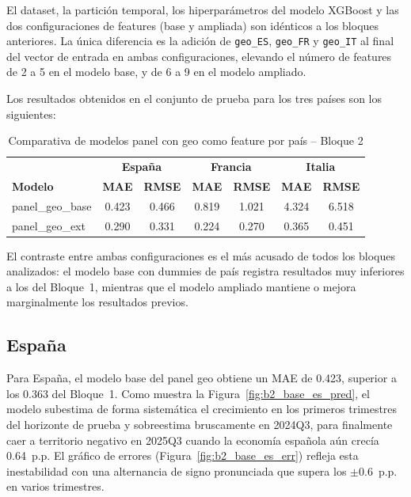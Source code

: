 El dataset, la partición temporal, los hiperparámetros del modelo XGBoost y las dos
configuraciones de features (base y ampliada) son idénticos a los bloques anteriores.
La única diferencia es la adición de \texttt{geo\_ES}, \texttt{geo\_FR} y \texttt{geo\_IT}
al final del vector de entrada en ambas configuraciones, elevando el número de features
de 2 a 5 en el modelo base, y de 6 a 9 en el modelo ampliado.

Los resultados obtenidos en el conjunto de prueba para los tres países son los siguientes:

\begin{table}[H]
\centering
\caption{Comparativa de modelos panel con geo como feature por país -- Bloque 2}
\label{tab:bloque2}
\small
\begin{tabular}{lcccccc}
\hline
 & \multicolumn{2}{c}{\textbf{España}} & \multicolumn{2}{c}{\textbf{Francia}} & \multicolumn{2}{c}{\textbf{Italia}} \\
\textbf{Modelo} & \textbf{MAE} & \textbf{RMSE} & \textbf{MAE} & \textbf{RMSE} & \textbf{MAE} & \textbf{RMSE} \\
\hline
panel\_geo\_base & 0.423 & 0.466 & 0.819 & 1.021 & 4.324 & 6.518 \\
panel\_geo\_ext  & 0.290 & 0.331 & 0.224 & 0.270 & 0.365 & 0.451 \\
\hline
\end{tabular}
\end{table}

El contraste entre ambas configuraciones es el más acusado de todos los bloques analizados:
el modelo base con dummies de país registra resultados muy inferiores a los del Bloque~1,
mientras que el modelo ampliado mantiene o mejora marginalmente los resultados previos.

\FloatBarrier
\subsection{España}

Para España, el modelo base del panel geo obtiene un MAE de 0.423, superior a los 0.363 del
Bloque~1. Como muestra la Figura~\ref{fig:b2_base_es_pred}, el modelo subestima de forma
sistemática el crecimiento en los primeros trimestres del horizonte de prueba y sobreestima
bruscamente en 2024Q3, para finalmente caer a territorio negativo en 2025Q3 cuando la
economía española aún crecía 0.64~p.p. El gráfico de errores
(Figura~\ref{fig:b2_base_es_err}) refleja esta inestabilidad con una alternancia de signo
pronunciada que supera los $\pm$0.6~p.p. en varios trimestres.

